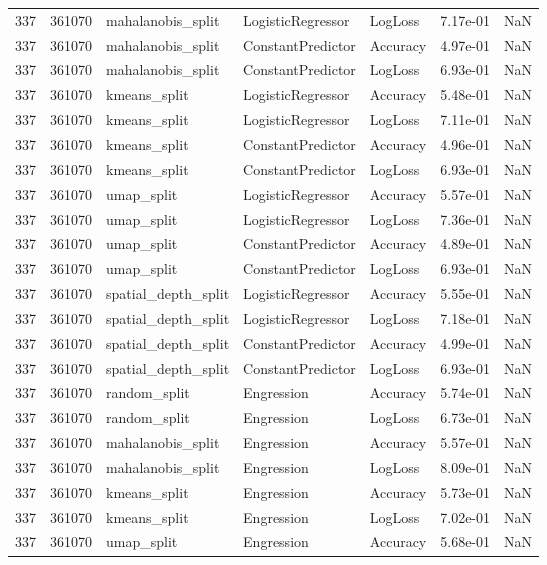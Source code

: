 \begin{tabular}{rrlllrr}
337 & 361070 & mahalanobis\_split & LogisticRegressor & LogLoss & 7.17e-01 & NaN \\
337 & 361070 & mahalanobis\_split & ConstantPredictor & Accuracy & 4.97e-01 & NaN \\
337 & 361070 & mahalanobis\_split & ConstantPredictor & LogLoss & 6.93e-01 & NaN \\
337 & 361070 & kmeans\_split & LogisticRegressor & Accuracy & 5.48e-01 & NaN \\
337 & 361070 & kmeans\_split & LogisticRegressor & LogLoss & 7.11e-01 & NaN \\
337 & 361070 & kmeans\_split & ConstantPredictor & Accuracy & 4.96e-01 & NaN \\
337 & 361070 & kmeans\_split & ConstantPredictor & LogLoss & 6.93e-01 & NaN \\
337 & 361070 & umap\_split & LogisticRegressor & Accuracy & 5.57e-01 & NaN \\
337 & 361070 & umap\_split & LogisticRegressor & LogLoss & 7.36e-01 & NaN \\
337 & 361070 & umap\_split & ConstantPredictor & Accuracy & 4.89e-01 & NaN \\
337 & 361070 & umap\_split & ConstantPredictor & LogLoss & 6.93e-01 & NaN \\
337 & 361070 & spatial\_depth\_split & LogisticRegressor & Accuracy & 5.55e-01 & NaN \\
337 & 361070 & spatial\_depth\_split & LogisticRegressor & LogLoss & 7.18e-01 & NaN \\
337 & 361070 & spatial\_depth\_split & ConstantPredictor & Accuracy & 4.99e-01 & NaN \\
337 & 361070 & spatial\_depth\_split & ConstantPredictor & LogLoss & 6.93e-01 & NaN \\
337 & 361070 & random\_split & Engression & Accuracy & 5.74e-01 & NaN \\
337 & 361070 & random\_split & Engression & LogLoss & 6.73e-01 & NaN \\
337 & 361070 & mahalanobis\_split & Engression & Accuracy & 5.57e-01 & NaN \\
337 & 361070 & mahalanobis\_split & Engression & LogLoss & 8.09e-01 & NaN \\
337 & 361070 & kmeans\_split & Engression & Accuracy & 5.73e-01 & NaN \\
337 & 361070 & kmeans\_split & Engression & LogLoss & 7.02e-01 & NaN \\
337 & 361070 & umap\_split & Engression & Accuracy & 5.68e-01 & NaN \\

\end{tabular}

